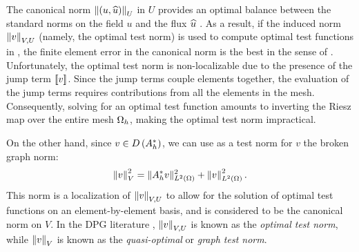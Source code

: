 The canonical norm $\nor{\LRp{u,\uh}}_U$ in $U$ provides an optimal balance between the standard norms on the field $u$ and the flux $\uh$ \cite{DPG4}. As a result, if the induced norm $\nor{v}_{V,U}$ (namely, the optimal test norm) is used to compute  optimal test functions in , the finite element error in the canonical norm is the best in the sense of . Unfortunately, the optimal test norm is non-localizable due to the presence of the jump term $\jump{v}$. Since the jump terms couple elements together, the evaluation of the jump terms requires contributions from all the elements in the mesh. Consequently, solving for an optimal test function amounts to inverting the Riesz map over the entire mesh $\Oh$, making the optimal test norm impractical.

On the other hand, since $v \in D\LRp{A^*_h}$, we can use as a test norm for $v$ the broken graph norm: 
\[
\nor{v}_V^2 =  \|A_h^*v\|_{\L}^2 + \nor{v}_{\L}^2.
\]
This norm is a localization of $\nor{v}_{V,U}$ to allow for the solution of optimal test functions on an element-by-element basis, and is considered to be the canonical norm on $V$.  In the DPG literature \cite{DPG4}, $\nor{v}_{V,U}$ is known as the {\em optimal test norm}, while $\nor{v}_{V}$ is known as the {\em quasi-optimal} or {\em graph test norm}.



